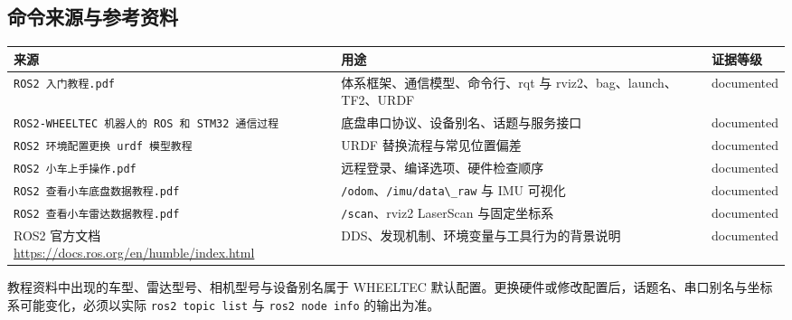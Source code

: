 \subsection{命令来源与参考资料}\label{ux547dux4ee4ux6765ux6e90ux4e0eux53c2ux8003ux8d44ux6599}

\begin{longtable}[]{@{}
  >{\raggedright\arraybackslash}p{}
  >{\raggedright\arraybackslash}p{}
  >{\raggedright\arraybackslash}p{}@{}}
\toprule\noalign{}
\begin{minipage}[b]{\linewidth}\raggedright
来源
\end{minipage} & \begin{minipage}[b]{\linewidth}\raggedright
用途
\end{minipage} & \begin{minipage}[b]{\linewidth}\raggedright
证据等级
\end{minipage} \\
\midrule\noalign{}
\endhead
\bottomrule\noalign{}
\endlastfoot
\passthrough{\lstinline!ROS2 入门教程.pdf!} &
体系框架、通信模型、命令行、rqt 与 rviz2、bag、launch、TF2、URDF &
documented \\
\passthrough{\lstinline!ROS2-WHEELTEC 机器人的 ROS 和 STM32 通信过程!} &
底盘串口协议、设备别名、话题与服务接口 & documented \\
\passthrough{\lstinline!ROS2 环境配置更换 urdf 模型教程!} & URDF
替换流程与常见位置偏差 & documented \\
\passthrough{\lstinline!ROS2 小车上手操作.pdf!} &
远程登录、编译选项、硬件检查顺序 & documented \\
\passthrough{\lstinline!ROS2 查看小车底盘数据教程.pdf!} &
\passthrough{\lstinline!/odom!}、\passthrough{\lstinline!/imu/data\_raw!}
与 IMU 可视化 & documented \\
\passthrough{\lstinline!ROS2 查看小车雷达数据教程.pdf!} &
\passthrough{\lstinline!/scan!}、rviz2 LaserScan 与固定坐标系 &
documented \\
ROS2 官方文档 \url{https://docs.ros.org/en/humble/index.html} &
DDS、发现机制、环境变量与工具行为的背景说明 & documented \\
\end{longtable}

教程资料中出现的车型、雷达型号、相机型号与设备别名属于 WHEELTEC
默认配置。更换硬件或修改配置后，话题名、串口别名与坐标系可能变化，必须以实际
\passthrough{\lstinline!ros2 topic list!} 与
\passthrough{\lstinline!ros2 node info!} 的输出为准。

